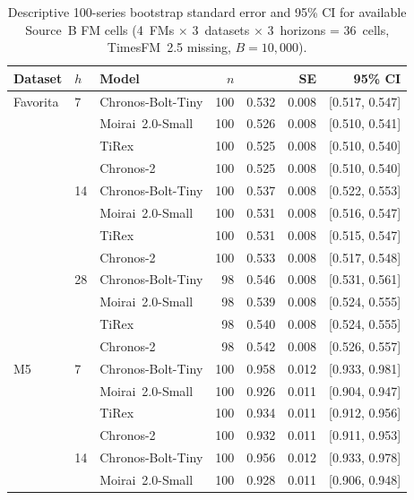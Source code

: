 \begin{table}[htbp]
\centering
\caption{Descriptive 100-series bootstrap standard error and 95\% CI for
available Source~B FM
cells (4~FMs $\times$ 3~datasets $\times$ 3~horizons = 36~cells,
TimesFM~2.5 missing, $B = 10{,}000$).}\label{tab:bootstrap-se}
\footnotesize
\begin{tabular}{lllrrrr}
\toprule
Dataset  & $h$ & Model & $n$ & \WAPE{} & SE & 95\% CI \\
\midrule
Favorita & 7  & Chronos-Bolt-Tiny & 100 & 0.532 & 0.008 & [0.517, 0.547] \\
         &    & Moirai~2.0-Small  & 100 & 0.526 & 0.008 & [0.510, 0.541] \\
         &    & TiRex             & 100 & 0.525 & 0.008 & [0.510, 0.540] \\
         &    & Chronos-2         & 100 & 0.525 & 0.008 & [0.510, 0.540] \\
\addlinespace
         & 14 & Chronos-Bolt-Tiny & 100 & 0.537 & 0.008 & [0.522, 0.553] \\
         &    & Moirai~2.0-Small  & 100 & 0.531 & 0.008 & [0.516, 0.547] \\
         &    & TiRex             & 100 & 0.531 & 0.008 & [0.515, 0.547] \\
         &    & Chronos-2         & 100 & 0.533 & 0.008 & [0.517, 0.548] \\
\addlinespace
         & 28 & Chronos-Bolt-Tiny &  98 & 0.546 & 0.008 & [0.531, 0.561] \\
         &    & Moirai~2.0-Small  &  98 & 0.539 & 0.008 & [0.524, 0.555] \\
         &    & TiRex             &  98 & 0.540 & 0.008 & [0.524, 0.555] \\
         &    & Chronos-2         &  98 & 0.542 & 0.008 & [0.526, 0.557] \\
\addlinespace
M5       & 7  & Chronos-Bolt-Tiny & 100 & 0.958 & 0.012 & [0.933, 0.981] \\
         &    & Moirai~2.0-Small  & 100 & 0.926 & 0.011 & [0.904, 0.947] \\
         &    & TiRex             & 100 & 0.934 & 0.011 & [0.912, 0.956] \\
         &    & Chronos-2         & 100 & 0.932 & 0.011 & [0.911, 0.953] \\
\addlinespace
         & 14 & Chronos-Bolt-Tiny & 100 & 0.956 & 0.012 & [0.933, 0.978] \\
         &    & Moirai~2.0-Small  & 100 & 0.928 & 0.011 & [0.906, 0.948] \\

\end{tabular}
\end{table}
